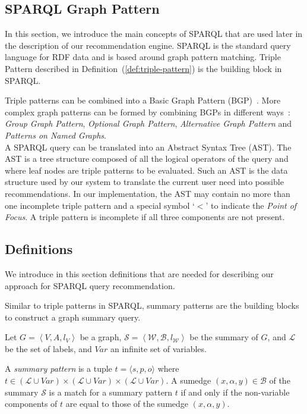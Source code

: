 \subsection{SPARQL Graph Pattern}

In this section, we introduce the main concepts of SPARQL that are used later in the description of our recommendation engine. SPARQL is the standard query language for RDF data and is based around graph pattern matching. Triple Pattern described in Definition~(\ref{def:triple-pattern}) is the building block in SPARQL.

Triple patterns can be combined into a Basic Graph Pattern (BGP)~\cite{PrudS08}. More complex graph patterns can be formed by combining BGPs in different ways~\cite{PrudS08}: \emph{Group Graph Pattern}, \emph{Optional Graph Pattern}, \emph{Alternative Graph Pattern} and \emph{Patterns on Named Graphs}.\\

A SPARQL query can be translated into an Abstract Syntax Tree (AST). The AST is a tree structure composed of all the logical operators of the query and where leaf nodes are triple patterns to be evaluated. Such an AST is the data structure used by our system to translate the current user need into possible recommendations. In our implementation, the AST may contain no more than one incomplete triple pattern and a special symbol `$<$' to indicate the \emph{Point of Focus}. A triple pattern is incomplete if all three components are not present.

\subsection{Definitions}

We introduce in this section definitions that are needed for describing our approach for SPARQL query recommendation.

Similar to triple patterns in SPARQL, summary patterns are the building blocks to construct a graph summary query.

\begin{definition}
	Let $G=\left\langle V, A, l_V \right\rangle$ be a graph, $\mathcal{S} = \left\langle \mathcal{W}, \mathcal{B}, l_{\mathcal{W}} \right\rangle$ be the summary of $G$, and $\mathcal{L}$ be the set of labels, and $Var$ an infinite set of variables.

	A \emph{summary pattern} is a tuple $t = \langle s, p, o \rangle$ where $t \in (\mathcal{L} \cup Var) \times (\mathcal{L} \cup Var) \times (\mathcal{L} \cup Var)$.
	A sumedge $(x,\alpha,y) \in \mathcal{B}$ of the summary $\mathcal{S}$ is a match for a summary pattern $t$ if and only if the non-variable components of $t$ are equal to those of the sumedge $(x, \alpha, y)$.
	\label{def:summary-triple-pattern}
\end{definition}

